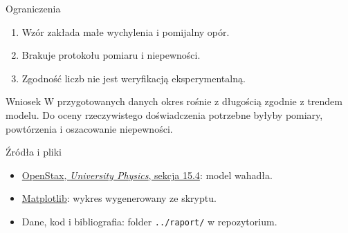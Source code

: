 \documentclass[aspectratio=169,11pt]{beamer}
\begin{document}
\begin{frame}{Ograniczenia}
  \begin{enumerate}
    \item Wzór zakłada małe wychylenia i pomijalny opór.
    \item Brakuje protokołu pomiaru i niepewności.
    \item Zgodność liczb nie jest weryfikacją eksperymentalną.
  \end{enumerate}
\end{frame}

\begin{frame}{Wniosek}
  W przygotowanych danych okres rośnie z długością zgodnie z trendem
  modelu. Do oceny rzeczywistego doświadczenia potrzebne byłyby
  pomiary, powtórzenia i oszacowanie niepewności.
\end{frame}

\begin{frame}{Źródła i pliki}
  \begin{itemize}
    \item \href{https://openstax.org/books/university-physics-volume-1/pages/15-4-pendulums}{OpenStax, \emph{University Physics}, sekcja 15.4}: model wahadła.
    \item \href{https://matplotlib.org/stable/}{Matplotlib}: wykres wygenerowany ze skryptu.
    \item Dane, kod i bibliografia: folder \texttt{../raport/} w repozytorium.
  \end{itemize}
\end{frame}
\end{document}
